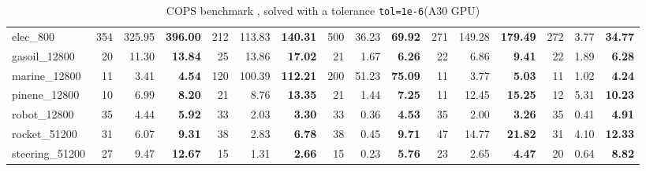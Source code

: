 \begin{table}[!ht]
{\begin{tabular}{|l|rr >{\bfseries}r|rr >{\bfseries}r|rr >{\bfseries}r|rr >{\bfseries}r|rr >{\bfseries}r|}
      elec\_800 & 354 & 325.95 & 396.00 & 212 & 113.83 & 140.31 & 500 & 36.23 & 69.92 & 271 & 149.28 & 179.49 & 272 & 3.77 & 34.77 \\
      gasoil\_12800 & 20 & 11.30 & 13.84 & 25 & 13.86 & 17.02 & 21 & 1.67 & 6.26 & 22 & 6.86 & 9.41 & 22 & 1.89 & 6.28 \\
      marine\_12800 & 11 & 3.41 & 4.54 & 120 & 100.39 & 112.21 & 200 & 51.23 & 75.09 & 11 & 3.77 & 5.03 & 11 & 1.02 & 4.24 \\
      pinene\_12800 & 10 & 6.99 & 8.20 & 21 & 8.76 & 13.35 & 21 & 1.44 & 7.25 & 11 & 12.45 & 15.25 & 12 & 5.31 & 10.23 \\
      robot\_12800 & 35 & 4.44 & 5.92 & 33 & 2.03 & 3.30 & 33 & 0.36 & 4.53 & 35 & 2.00 & 3.26 & 35 & 0.41 & 4.91 \\
      rocket\_51200 & 31 & 6.07 & 9.31 & 38 & 2.83 & 6.78 & 38 & 0.45 & 9.71 & 47 & 14.77 & 21.82 & 31 & 4.10 & 12.33 \\
      steering\_51200 & 27 & 9.47 & 12.67 & 15 & 1.31 & 2.66 & 15 & 0.23 & 5.76 & 23 & 2.65 & 4.47 & 20 & 0.64 & 8.82 \\
    \hline
    \end{tabular}
  }
  \caption{COPS benchmark , solved with a tolerance {\tt tol=1e-6}\label{tab:cops:benchmark} (A30 GPU)}
\end{table}


